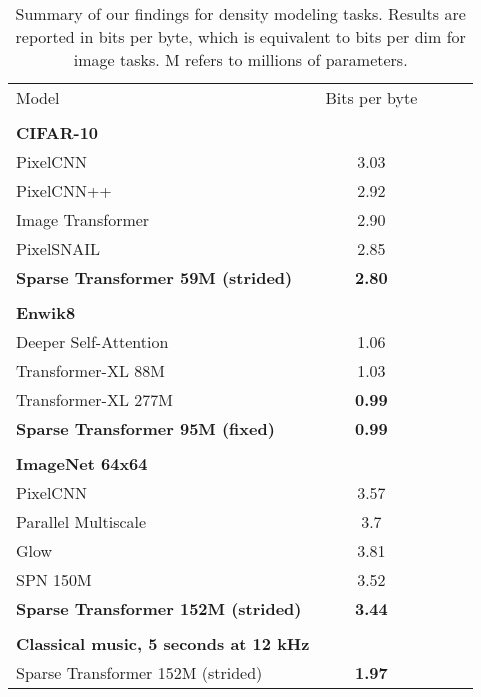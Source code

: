 \documentclass{article}
\begin{document}
\begin{table}[t]
\caption{Summary of our findings for density modeling tasks. Results are reported in bits per byte, which is equivalent to bits per dim for image tasks. M refers to millions of parameters.}
\label{all_results}
\vskip 0.15in
\begin{center}
\begin{small}
\begin{tabular}{lcccr}
\toprule
Model & Bits per byte\\
\quad \\

\textbf{CIFAR-10}\\
\midrule
PixelCNN \cite{oord2016pixel} & 3.03\\
PixelCNN++ \cite{salimans2017pixelcnn++} & 2.92\\
Image Transformer \cite{parmar2018image} & 2.90\\
PixelSNAIL \cite{chen2017pixelsnail} & 2.85\\
\textbf{Sparse Transformer 59M (strided)} & \textbf{2.80} \\


\quad \\
\textbf{Enwik8}\\
\midrule
Deeper Self-Attention \cite{al2018character} & 1.06\\
Transformer-XL 88M \cite{dai2018transformer} & 1.03 \\
Transformer-XL 277M \cite{dai2018transformer} & \textbf{0.99}\\
\textbf{Sparse Transformer 95M (fixed)} & \textbf{0.99}\\

\quad \\
\textbf{ImageNet 64x64}\\
\midrule
PixelCNN \cite{oord2016pixel} & 3.57 \\
Parallel Multiscale \cite{reed2017parallel} & 3.7 \\
Glow \cite{kingma2018glow} & 3.81 \\
SPN 150M \cite{menick2018generating} & 3.52 \\
\textbf{Sparse Transformer 152M (strided)} & \textbf{3.44} \\


\quad \\
\textbf{Classical music, 5 seconds at 12 kHz} \\
\midrule
Sparse Transformer 152M (strided) & \textbf{1.97} \\

\bottomrule
\end{tabular}
\end{small}
\end{center}
\vskip -0.1in
\end{table}
\end{document}
